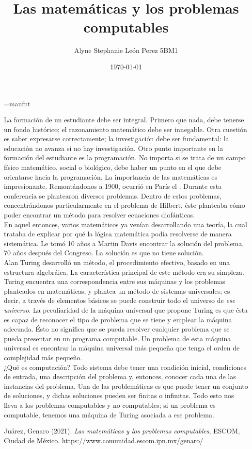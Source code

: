 \documentclass[a4paper,12pt]{article}
\begin{document}
	\title{Las matemáticas y los problemas computables \cite{texbook}}
	\author{Alyne Stephanie León Perez 5BM1}
	\date{\today}
	\maketitle
	\font\logo=manfnt 
	\def\MF{{\logo META}\-{\logo FONT}}
	
	\noindent La formación de un estudiante debe ser integral. Primero que nada, debe tenerse un fondo histórico; el razonamiento matemático debe ser innegable. Otra cuestión es saber expresarse correctamente; la investigación debe ser fundamental: la educación no avanza si no hay investigación. Otro punto importante en la formación del estudiante es la programación. No importa si se trata de un campo físico matemático, social o biológico, debe haber un punto en el que debe orientarse hacia la programación.
	La importancia de las matemáticas es impresionante. Remontándonos a 1900, ocurrió en París el \textit{}. Durante esta conferencia se plantearon diversos problemas. Dentro de estos problemas, concentrándonos particularmente en el problema de Hilbert, éste planteaba cómo poder encontrar un método para resolver ecuaciones diofánticas.\\ 
	En aquel entonces, varios matemáticos ya venían desarrollando una teoría, la cual trataba de explicar por qué la lógica matemática podía resolverse de manera sistemática. Le tomó 10 años a Martin Davis encontrar la solución del problema, 70 años después del Congreso. La solución es que no tiene solución.\\
	Alan Turing desarrolló un método, el procedimiento efectivo, basado en una estructura algebráica. La característica principal de este método era su simpleza. Turing encuentra una correspondencia entre sus máquinas y los problemas planteados en matemáticas, y plantea un método de sistemas universales; es decir, a través de elementos básicos se puede construir todo el universo de \textit{ese universo}.
	La peculiaridad de la máquina universal que propone Turing es que ésta es capaz de reconocer el tipo de problema que se tiene y emplear la máquina adecuada. Ésto no significa que se pueda resolver cualquier problema que se pueda presentar en un programa computable. Un problema de esta máquina universal es encontrar la máquina universal más pequeña que tenga el orden de complejidad más pequeño.\\
	¿Qué es computación? Todo sistema debe tener una condición inicial, condiciones de entrada, una descripción del problema y, entonces, conocer cada una de las instancias del problema. Una de las problemáticas es que puede tener un conjunto de soluciones, y dichas soluciones pueden ser finitas o infinitas. Todo esto nos lleva a los problemas computables y no computables; si un problema es computable, tenemos una máquina de Turing asociada a ese problema.
	
	
	
	\begin{thebibliography}{9}
		Juárez, Genaro (2021). \emph{Las matemáticas y los problemas computables}, ESCOM, Ciudad de México. https://www.comunidad.escom.ipn.mx/genaro/
	\end{thebibliography}
	
	
\end{document}
